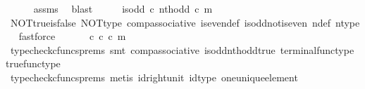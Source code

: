 \begin{isabellebody}
\ \ \ \ \isamarkupfalse%
\ assms{\isacharparenleft}{\kern0pt}{}{\isacharparenright}{\kern0pt}\ \isamarkupfalse%
\ blast\isanewline
\ \ \isamarkupfalse%
\ \isamarkupfalse%
\ {\isachardoublequoteopen}is{\isacharunderscore}{\kern0pt}odd\ {\isasymcirc}\isactrlsub c\ nth{\isacharunderscore}{\kern0pt}odd\ {\isasymcirc}\isactrlsub c\ m\ {\isacharequal}{\kern0pt}\ {\isasymf}{\isachardoublequoteclose}\isanewline
\ \ \ \ \isamarkupfalse%
\ NOT{\isacharunderscore}{\kern0pt}true{\isacharunderscore}{\kern0pt}is{\isacharunderscore}{\kern0pt}false\ NOT{\isacharunderscore}{\kern0pt}type\ comp{\isacharunderscore}{\kern0pt}associative{}\ is{\isacharunderscore}{\kern0pt}even{\isacharunderscore}{\kern0pt}def{}\ is{\isacharunderscore}{\kern0pt}odd{\isacharunderscore}{\kern0pt}not{\isacharunderscore}{\kern0pt}is{\isacharunderscore}{\kern0pt}even\ n{\isacharunderscore}{\kern0pt}def\ n{\isacharunderscore}{\kern0pt}type\ \isamarkupfalse%
\ fastforce\isanewline
\ \ \isamarkupfalse%
\ \isamarkupfalse%
\ {\isachardoublequoteopen}{\isasymt}\ {\isasymcirc}\isactrlsub c\ {\isasymbeta}\isactrlbsub {\isasymnat}\isactrlsub c\isactrlesub \ {\isasymcirc}\isactrlsub c\ m\ {\isacharequal}{\kern0pt}\ {\isasymf}{\isachardoublequoteclose}\isanewline
\ \ \ \ \isamarkupfalse%
\ {\isacharparenleft}{\kern0pt}typecheck{\isacharunderscore}{\kern0pt}cfuncs{\isacharunderscore}{\kern0pt}prems{\isacharcomma}{\kern0pt}\ smt\ comp{\isacharunderscore}{\kern0pt}associative{}\ is{\isacharunderscore}{\kern0pt}odd{\isacharunderscore}{\kern0pt}nth{\isacharunderscore}{\kern0pt}odd{\isacharunderscore}{\kern0pt}true\ terminal{\isacharunderscore}{\kern0pt}func{\isacharunderscore}{\kern0pt}type\ true{\isacharunderscore}{\kern0pt}func{\isacharunderscore}{\kern0pt}type{\isacharparenright}{\kern0pt}\isanewline
\ \ \isamarkupfalse%
\ \isamarkupfalse%
\ {\isachardoublequoteopen}{\isasymt}\ {\isacharequal}{\kern0pt}\ {\isasymf}{\isachardoublequoteclose}\isanewline
\ \ \ \ \isamarkupfalse%
\ {\isacharparenleft}{\kern0pt}typecheck{\isacharunderscore}{\kern0pt}cfuncs{\isacharunderscore}{\kern0pt}prems{\isacharcomma}{\kern0pt}\ metis\ id{\isacharunderscore}{\kern0pt}right{\isacharunderscore}{\kern0pt}unit{}\ id{\isacharunderscore}{\kern0pt}type\ one{\isacharunderscore}{\kern0pt}unique{\isacharunderscore}{\kern0pt}element{\isacharparenright}{\kern0pt}\isanewline
\ \ \isamarkupfalse%

\end{isabellebody}

